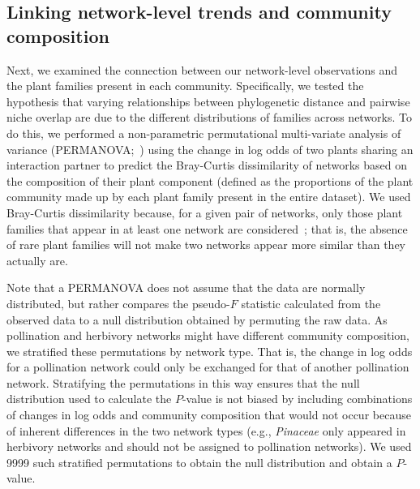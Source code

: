 \documentclass[12pt]{article}
\begin{document}
\begin{spacing}{1.5}
\subsection*{Linking network-level trends and community composition}

  Next, we examined the connection between our network-level observations
  and the plant families present in each community.
  Specifically, we tested the hypothesis that
  varying relationships between phylogenetic distance and
  pairwise niche overlap are due to the different distributions 
  of families across networks. To do this, we performed a non-parametric
  permutational multi-variate analysis of variance
  (PERMANOVA;~\citealp{Anderson2001}) using the change in log
  odds of two plants sharing an interaction partner to 
  predict the Bray-Curtis dissimilarity of networks
  based on the composition of their plant component
  (defined as the proportions of the plant community
  made up by each plant family present in the entire dataset).
  We used Bray-Curtis dissimilarity because, for a given
  pair of networks, only those plant families that appear
  in at least one network are considered~\citep{Anderson2001,Cirtwill2015}; 
  that is, the absence of rare plant families will not make 
  two networks appear more similar than they actually are. 


  Note that a PERMANOVA does not assume that the data are 
  normally distributed, but rather compares the pseudo-$F$ 
  statistic calculated from the observed data to a null 
  distribution obtained by permuting the raw data. As 
  pollination and herbivory networks might have different
  community composition, we stratified these permutations
  by network type. That is, the change in log odds for a pollination
  network could only be exchanged for that of another pollination
  network. Stratifying the permutations in this way ensures that 
  the null distribution used to calculate the $P$-value is not 
  biased by including combinations of changes in log odds and 
  community composition that would not occur because of inherent 
  differences in the two network types (e.g., \emph{Pinaceae} 
  only appeared in herbivory networks and should not be assigned 
  to pollination networks). We used 9999 such stratified permutations 
  to obtain the null distribution and obtain a $P$-value.



\end{spacing}
\end{document}

